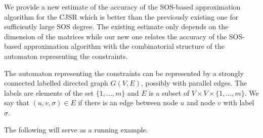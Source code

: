 \documentclass{sig-alternate-05-2015}
\newcommand{\1}{\mathbf{1}}
\theoremstyle{definition}
\newcommand{\G}{G}
\newcommand{\Nodes}{V}
\newcommand{\Arcs}{E}
\newcommand{\arc}{edge}
\newcommand{\arcs}{edges}
\begin{document}
We provide a new estimate of the accuracy of the SOS-based approximation algorithm for the CJSR which is better
than the previously existing one for sufficiently large SOS degree.
The existing estimate only depends on the dimension of the matrices
while our new one relates the accuracy of the SOS-based approximation algorithm with the combinatorial structure of the automaton representing the constraints.

The automaton representing the constraints can be represented by a
strongly connected labelled directed graph $\G(\Nodes,\Arcs)$,
possibly with parallel \arcs{}.  The labels are elements of the set
$\{1, \ldots, m\}$ and $\Arcs$ is a subset of $\Nodes \times \Nodes
\times \{1, \ldots, m\}$.  We say that $(u,v,\sigma) \in \Arcs$ if
there is an \arc{} between node $u$ and node $v$ with label $\sigma$.

The following will serve as a running example.
\end{document}
